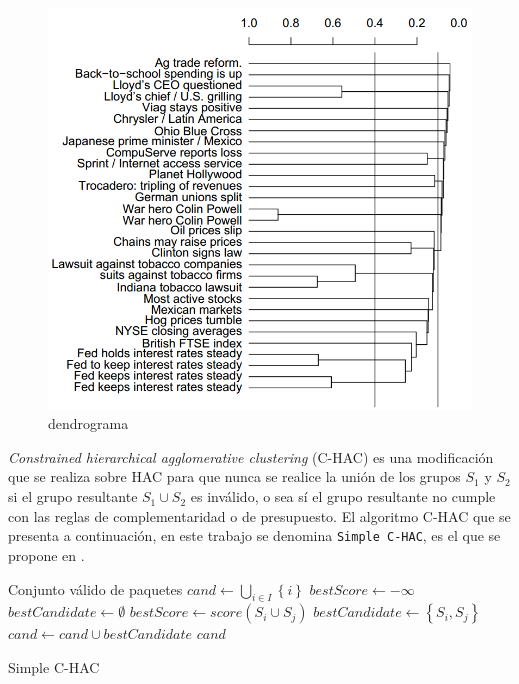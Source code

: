 \begin{figure}[H]
  \centering
    \includegraphics[width=1\textwidth]{img/Dendrogram.png}
  \caption{dendrograma}
  \label{des:Dendrogram}
\end{figure}

\textit{Constrained hierarchical agglomerative clustering} (C-HAC) es una modificación que se realiza sobre HAC para que nunca se realice la unión de los grupos $S_1$ y $S_2$ si el grupo resultante $S_1 \cup S_2$ es inválido, o sea sí el grupo resultante no cumple con las reglas de complementaridad o de presupuesto. El algoritmo C-HAC que se presenta a continuación, en este trabajo se denomina \texttt{Simple C-HAC}, es el que se propone en \cite{compositeRetrival}.

\begin{algorithm}[H]
\begin{algorithmic}[1]
\ENSURE Conjunto válido de paquetes
\STATE $cand \leftarrow \bigcup_{i \in I}\left\{i\right\}$
	\STATE $bestScore \leftarrow -\infty$
	\STATE $bestCandidate \leftarrow \emptyset$
			 \label{validMerge}
				 \label{score}
					\STATE $bestScore \leftarrow score(S_i \cup  S_j)$
					\STATE $bestCandidate \leftarrow \left\{S_i,S_j\right\}$
				\ENDIF
			\ENDIF
		\ENDFOR
	\ENDFOR
		\BREAK
	\ENDIF
	\STATE $cand \leftarrow cand \cup bestCandidate $
\ENDWHILE
\RETURN $cand$
\end{algorithmic}
\caption{Simple C-HAC}\label{alg:SimpleC-HAC}
\end{algorithm}

